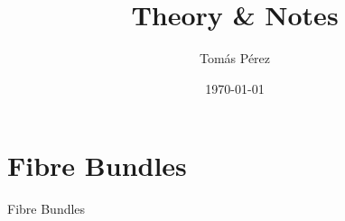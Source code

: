 \documentclass{homework}
\author{Tomás Pérez}
\date{\today}
\title{Theory \& Notes}
\begin{document}
 \maketitle

\tableofcontents

\iffalse
\section{{\textbf{Results from Group Theory}}}
{a_Preliminaries on Group Theory}
\clearpage

\section{{\textbf{Results from Topology}}}
{b_Preliminaries on Topology}
\clearpage

\section{{\textbf{Results from Differential Geometry}}}
{c_Preliminaies on Differential Geometry}
\clearpage

\section{{\textbf{Complex Geometry}}}
{Complex Geometry}
\fi

\section{{\textbf{Fibre Bundles}}}
{Fibre Bundles}


%
%
\end{document}
